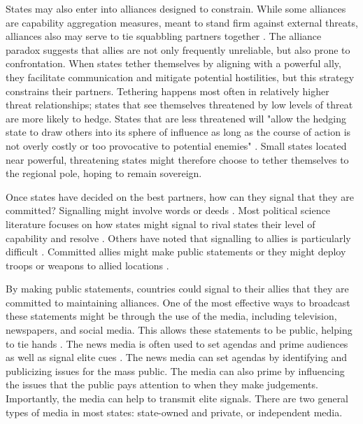 \documentclass[12pt]{article}
\begin{document}
States may also enter into alliances designed to constrain. While some alliances are capability aggregation measures, meant to stand firm against external threats, alliances also may serve to tie squabbling partners together \citep{weitsman_dangerous_2004}. The alliance paradox suggests that allies are not only frequently unreliable, but also prone to confrontation. When states tether themselves by aligning with a powerful ally, they facilitate communication and mitigate potential hostilities, but this strategy constrains their partners. Tethering happens most often in relatively higher threat relationships; states that see themselves threatened by low levels of threat are more likely to hedge. States that are less threatened will "allow the hedging state to draw others into its sphere of influence as long as the course of action is not overly costly or too provocative to potential enemies" \citep{weitsman_dangerous_2004}. Small states located near powerful, threatening states might therefore choose to tether themselves to the regional pole, hoping to remain sovereign. 

Once states have decided on the best partners, how can they signal that they are committed? Signalling might involve words or deeds \citep{fuhrmann_signaling_2014}. Most political science literature focuses on how states might signal to rival states their level of capability and resolve \citep{fearon_signaling_1997, kertzer_resolve_2016}. Others have noted that signalling to allies is particularly difficult \citep{schelling_arms_1967}. Committed allies might make public statements or they might deploy troops or weapons to allied locations \citep{fuhrmann_signaling_2014, blankenship_trivial_2022}. 

By making public statements, countries could signal to their allies that they are committed to maintaining alliances. One of the most effective ways to broadcast these statements might be through the use of the media, including television, newspapers, and social media. This allows these statements to be public, helping to tie hands \citep{fearon_signaling_1997}. The news media is often used to set agendas and prime audiences as well as signal elite cues \citep{iyengar_news_2010, chong_framing_2007}. The news media can set agendas by identifying and publicizing issues for the mass public. The media can also prime by influencing the issues that the public pays attention to when they make judgements. Importantly, the media can help to transmit elite signals. There are two general types of media in most states: state-owned and private, or independent media. 
\end{document}
